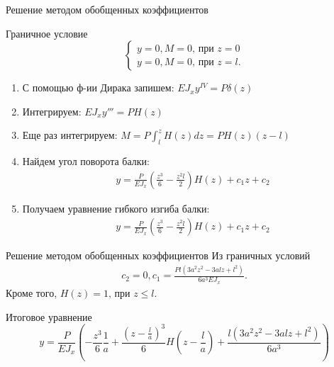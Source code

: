 \documentclass[ignoreonframetext,unicode]{beamer}
\begin{document}
\begin{frame}{Решение методом обобщенных коэффициентов}
	
	\begin{block}{Граничное условие}
		\[
		\begin{cases}
			y = 0, M = 0 \mbox{, при } z = 0\\
			y = 0, M = 0 \mbox{, при } z = l.
		\end{cases}
		\]		
	\end{block}
	
	\begin{enumerate}
		\item С помощью ф-ии Дирака запишем: $E J_{x} y^{IV} = P \delta (z)$
		
		\item Интегрируем:
		$
		E J_{x} y''' = P H (z)
		$
		
		\item Еще раз интегрируем:
		$
		M = P \int_l^z  H (z) dz = P H (z) (z - l)
		$
		
		\item Найдем угол поворота балки:
		\begin{gather*}
			y = \frac{P}{E J_{x}} (\frac{z^3}{6} - \frac{z^2 l}{2}) H(z) + c_1 z + c_2
		\end{gather*}
		
		\item Получаем уравнение гибкого изгиба балки:
		\begin{gather*}
			y = \frac{P}{E J_{x}} (\frac{z^3}{6} - \frac{z^2 l}{2}) H(z) + c_1 z + c_2
		\end{gather*}
		
	\end{enumerate}
\end{frame}

\begin{frame}{Решение методом обобщенных коэффициентов}
	Из граничных условий
	\begin{gather*}
		c_2 = 0, c_1 = \frac{P l(3 a^2 z^2 - 3 a l z + l^2)}{6 a^3 E J_{x}}.
	\end{gather*}
	Кроме того, $H(z) = 1 \mbox{, при } z \leqslant l$. 
	
		\begin{block}{Итоговое уравнение}	
			\[
			y = \frac{P}{E J_{x}} (-\frac{z^3}{6} \frac{1}{a} + \frac{(z - \frac{l}{a})^3}{6} H(z - \frac{l}{a}) + \frac{l(3 a^2 z^2 - 3 a l z + l^2)}{6 a^3})
			\]
		\end{block}
\end{frame}
\end{document}
